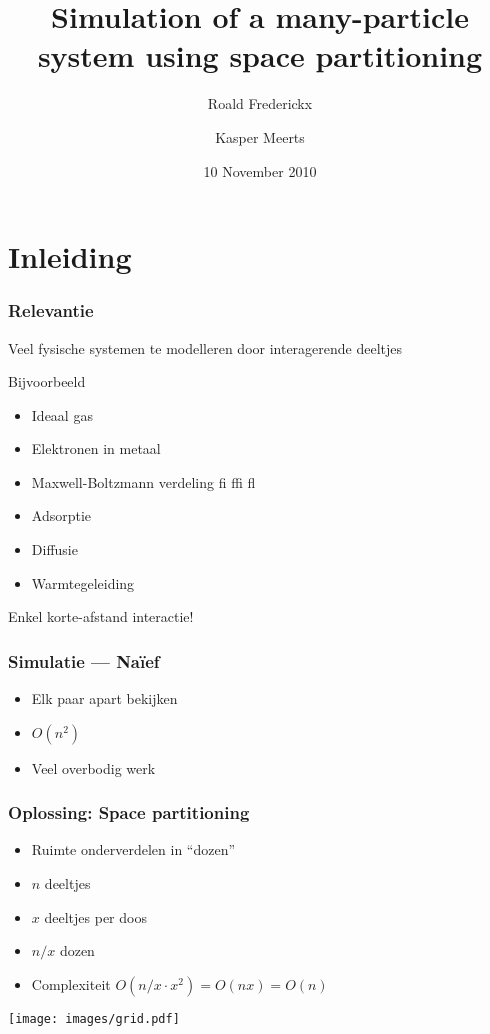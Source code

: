 \documentclass{beamer}
\title{Simulation of a many-particle system using space partitioning}
\author{Roald Frederickx \and Kasper Meerts}
\date{10 November 2010}
\newcommand{\figscale}[2]{
	\begin{center}
	\scalebox{#1}{
		
	}
	\end{center}
}
\begin{document}
\begin{frame}
\titlepage
\end{frame}

\begin{frame}
\tableofcontents
\end{frame}

\section{Inleiding}
\begin{frame}
\frametitle{Relevantie}
Veel fysische systemen te modelleren door interagerende deeltjes

Bijvoorbeeld
\begin{itemize}
\item Ideaal gas
\item Elektronen in metaal
\item Maxwell-Boltzmann verdeling fi ffi fl
\item Adsorptie
\item Diffusie
\item Warmtegeleiding
\end{itemize}

Enkel korte-afstand interactie!
\end{frame}

\begin{frame}
\frametitle{Simulatie --- Na\"ief}
\begin{itemize}
\item Elk paar apart bekijken
\item $O(n^2)$
\item Veel overbodig werk
\end{itemize}
\figscale{0.6}{quadraticComplexity}
\end{frame}

\begin{frame}
\frametitle{Oplossing: Space partitioning}
\begin{itemize}
\item Ruimte onderverdelen in ``dozen''
\item $n$ deeltjes
\item $x$ deeltjes per doos
\item $n/x$ dozen
\item Complexiteit $O(n/x \cdot x^2) = O(nx) = O(n)$
\end{itemize}
\begin{center}
\texttt{[image: images/grid.pdf]}
\end{center}
\end{frame}
\end{document}

